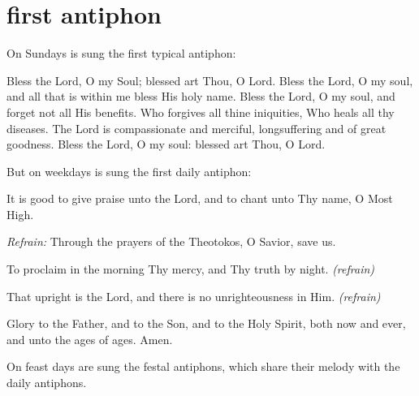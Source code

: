\section{first antiphon}

\begin{rubricmed}
    On Sundays is sung the first typical antiphon:
\end{rubricmed}

\begin{liturgicaltext}
    \choir Bless the Lord, O my Soul; blessed art Thou, O Lord. Bless the Lord, O my soul, and all that is within me bless His holy name. Bless the Lord, O my soul, and forget not all His benefits. Who forgives all thine iniquities, Who heals all thy diseases. The Lord is compassionate and merciful, longsuffering and of great goodness. Bless the Lord, O my soul: blessed art Thou, O Lord.
\end{liturgicaltext}

\begin{rubricmed}
    But on weekdays is sung the first daily antiphon:
\end{rubricmed}

\begin{liturgicaltext}
    \choir It is good to give praise unto the Lord, and to chant unto Thy name, O Most High.
    \item[] \textit{Refrain:} Through the prayers of the Theotokos, O Savior, save us.
    \item[] To proclaim in the morning Thy mercy, and Thy truth by night. \textit{(refrain)}
    \item[] That upright is the Lord, and there is no unrighteousness in Him. \textit{(refrain)}
    \item[] Glory to the Father, and to the Son, and to the Holy Spirit, both now and ever, and unto the ages of ages. Amen.
\end{liturgicaltext}

\begin{rubricmed}
    On feast days are sung the festal antiphons, which share their melody with the daily antiphons.
\end{rubricmed}